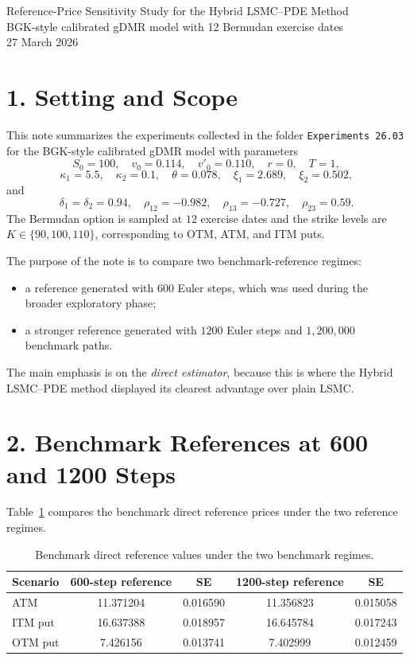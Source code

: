 \documentclass[11pt,a4paper]{article}
\begin{document}
\begin{center}
{\Large Reference-Price Sensitivity Study for the Hybrid LSMC--PDE Method}\\[0.5em]
{\normalsize BGK-style calibrated gDMR model with 12 Bermudan exercise dates}\\[0.5em]
{\normalsize 27 March 2026}
\end{center}

\section*{1. Setting and Scope}

This note summarizes the experiments collected in the folder \texttt{Experiments 26.03} for the BGK-style calibrated gDMR model with parameters
\[
S_0 = 100,\quad v_0 = 0.114,\quad v'_0 = 0.110,\quad r = 0,\quad T = 1,
\]
\[
\kappa_1 = 5.5,\quad \kappa_2 = 0.1,\quad \theta = 0.078,\quad \xi_1 = 2.689,\quad \xi_2 = 0.502,
\]
and
\[
\delta_1 = \delta_2 = 0.94,\quad \rho_{12} = -0.982,\quad \rho_{13} = -0.727,\quad \rho_{23} = 0.59.
\]
The Bermudan option is sampled at \(12\) exercise dates and the strike levels are \(K \in \{90,100,110\}\), corresponding to OTM, ATM, and ITM puts.

The purpose of the note is to compare two benchmark-reference regimes:
\begin{itemize}
\item a reference generated with \(600\) Euler steps, which was used during the broader exploratory phase;
\item a stronger reference generated with \(1200\) Euler steps and \(1{,}200{,}000\) benchmark paths.
\end{itemize}

The main emphasis is on the \emph{direct estimator}, because this is where the Hybrid LSMC--PDE method displayed its clearest advantage over plain LSMC.

\section*{2. Benchmark References at 600 and 1200 Steps}

Table~\ref{tab:references} compares the benchmark direct reference prices under the two reference regimes.

\begin{table}[h!]
\centering
\caption{Benchmark direct reference values under the two benchmark regimes.}
\label{tab:references}
\begin{tabular}{lcccc}
\toprule
Scenario & 600-step reference & SE & 1200-step reference & SE \\
\midrule
ATM & 11.371204 & 0.016590 & 11.356823 & 0.015058 \\
ITM put & 16.637388 & 0.018957 & 16.645784 & 0.017243 \\
OTM put & 7.426156 & 0.013741 & 7.402999 & 0.012459 \\
\bottomrule
\end{tabular}
\end{table}
\end{document}
